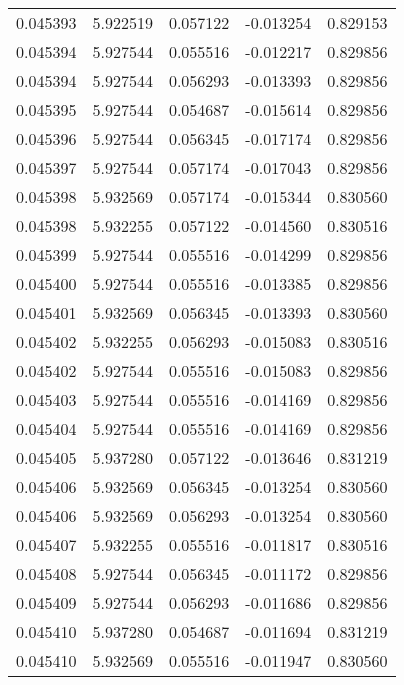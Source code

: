 \begin{tabular}{lrrrr}
0.045393    &  5.922519 &  0.057122 & -0.013254 &             0.829153 \\
0.045394    &  5.927544 &  0.055516 & -0.012217 &             0.829856 \\
0.045394    &  5.927544 &  0.056293 & -0.013393 &             0.829856 \\
0.045395    &  5.927544 &  0.054687 & -0.015614 &             0.829856 \\
0.045396    &  5.927544 &  0.056345 & -0.017174 &             0.829856 \\
0.045397    &  5.927544 &  0.057174 & -0.017043 &             0.829856 \\
0.045398    &  5.932569 &  0.057174 & -0.015344 &             0.830560 \\
0.045398    &  5.932255 &  0.057122 & -0.014560 &             0.830516 \\
0.045399    &  5.927544 &  0.055516 & -0.014299 &             0.829856 \\
0.045400    &  5.927544 &  0.055516 & -0.013385 &             0.829856 \\
0.045401    &  5.932569 &  0.056345 & -0.013393 &             0.830560 \\
0.045402    &  5.932255 &  0.056293 & -0.015083 &             0.830516 \\
0.045402    &  5.927544 &  0.055516 & -0.015083 &             0.829856 \\
0.045403    &  5.927544 &  0.055516 & -0.014169 &             0.829856 \\
0.045404    &  5.927544 &  0.055516 & -0.014169 &             0.829856 \\
0.045405    &  5.937280 &  0.057122 & -0.013646 &             0.831219 \\
0.045406    &  5.932569 &  0.056345 & -0.013254 &             0.830560 \\
0.045406    &  5.932569 &  0.056293 & -0.013254 &             0.830560 \\
0.045407    &  5.932255 &  0.055516 & -0.011817 &             0.830516 \\
0.045408    &  5.927544 &  0.056345 & -0.011172 &             0.829856 \\
0.045409    &  5.927544 &  0.056293 & -0.011686 &             0.829856 \\
0.045410    &  5.937280 &  0.054687 & -0.011694 &             0.831219 \\
0.045410    &  5.932569 &  0.055516 & -0.011947 &             0.830560 \\

\end{tabular}
